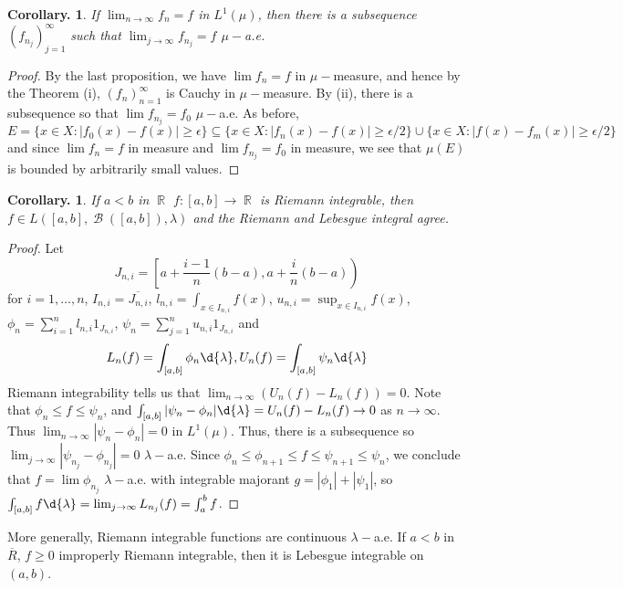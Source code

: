 \documentclass[11pt, a4paper]{memoir}
\DeclareMathOperator{\R}{{\mathbb{R}}}
\theoremstyle{change}
\newtheorem{corollary}[theorem]{Corollary.}
\theoremstyle{plain}
\theoremstyle{nonumberplain}
\newtheorem{proof}{Proof}
\DeclareMathOperator{\B}{{\mathcal{B}}}
\begin{document}
\begin{corollary}
    If $\lim_{n\to\infty}f_n=f$ in $L^1(\mu)$, then there is a subsequence $(f_{n_j})_{j=1}^\infty$ such that $\lim_{j\to\infty}f_{n_j}=f$ $\mu-$a.e.
\end{corollary}
\begin{proof}
    By the last proposition, we have $\lim f_n=f$ in $\mu-$measure, and hence by the Theorem (i), $(f_n)_{n=1}^\infty$ is Cauchy in $\mu-$measure.
    By (ii), there is a subsequence so that $\lim f_{n_j}=f_0$ $\mu-$a.e.
    As before,
    \begin{equation*}
        E=\{x\in X:|f_0(x)-f(x)|\geq\epsilon\}\subseteq\{x\in X:|f_n(x)-f(x)|\geq\epsilon/2\}\cup\{x\in X:|f(x)-f_m(x)|\geq\epsilon/2\}
    \end{equation*}
    and since $\lim f_n=f$ in measure and $\lim f_{n_j}=f_0$ in measure, we see that $\mu(E)$ is bounded by arbitrarily small values.
\end{proof}
\begin{corollary}
    If $a<b$ in $\R$ $f:[a,b]\to\R$ is Riemann integrable, then $f\in L([a,b],\B([a,b]),\lambda)$ and the Riemann and Lebesgue integral agree.
\end{corollary}
\begin{proof}
    Let
    \begin{equation*}
        J_{n,i}=\left[a+\frac{i-1}{n}(b-a),a+\frac{i}{n}(b-a)\right)
    \end{equation*}
    for $i=1,\ldots,n$, $I_{n,i}=\overline{J_{n,i}}$, $l_{n,i}=\int_{x\in I_{n,i}}f(x)$, $u_{n,i}=\sup_{x\in I_{n,i}}f(x)$, $\phi_n=\sum_{i=1}^n l_{n,i}1_{J_{n,i}}$, $\psi_n=\sum_{j=1}^n u_{n,i}1_{J_{n,i}}$ and
    \begin{align*}
        L_n(f)=\int_{[a,b]}\phi_n\d{\lambda},U_n(f)=\int_{[a,b]}\psi_n\d{\lambda}
    \end{align*}
    Riemann integrability tells us that $\lim_{n\to\infty}(U_n(f)-L_n(f))=0$.
    Note that $\phi_n\leq f\leq\psi_n$, and $\int_{[a,b]}|\psi_n-\phi_n|\d{\lambda}=U_n(f)-L_n(f)\to 0$ as $n\to\infty$.
    Thus $\lim_{n\to\infty}|\psi_n-\phi_n|=0$ in $L^1(\mu)$.
    Thus, there is a subsequence so $\lim_{j\to\infty}|\psi_{n_j}-\phi_{n_j}|=0$ $\lambda-$a.e.
    Since $\phi_n\leq\phi_{n+1}\leq f\leq\psi_{n+1}\leq\psi_n$, we conclude that $f=\lim\phi_{n_j}$ $\lambda-$a.e. with integrable majorant $g=|\phi_1|+|\psi_1|$, so $\int_{[a,b]}f\d{\lambda}=\lim_{j\to\infty}L_{n_j}(f)=\int_a^b f$.
\end{proof}
More generally, Riemann integrable functions are continuous $\lambda-$a.e.
If $a<b$ in $\overline{R}$, $f\geq 0$ improperly Riemann integrable, then it is Lebesgue integrable on $(a,b)$.
\end{document}
